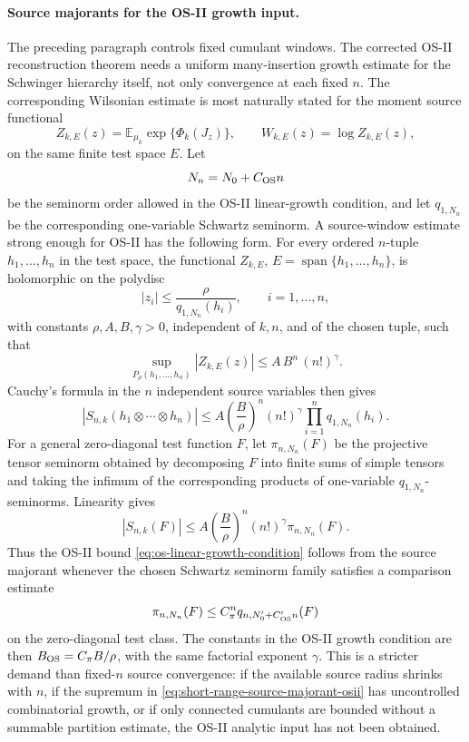 \paragraph{Source majorants for the OS-II growth input.}
The preceding paragraph controls fixed cumulant windows.  The corrected
OS-II reconstruction theorem needs a uniform many-insertion growth estimate
for the Schwinger hierarchy itself, not only convergence at each fixed
\(n\).  The corresponding Wilsonian estimate is most naturally stated for
the moment source functional
\begin{equation}
  Z_{k,E}(z)
  =
  \mathbb E_{\mu_k}\exp\{\Phi_k(J_z)\},
  \qquad
  W_{k,E}(z)=\log Z_{k,E}(z),
  \label{eq:short-range-moment-source-window}
\end{equation}
on the same finite test space \(E\).  Let
\[
  N_n=N_0+C_{\rm OS}n
\]
be the seminorm order allowed in the OS-II linear-growth condition, and let
\(q_{1,N_n}\) be the corresponding one-variable Schwartz seminorm.  A
source-window estimate strong enough for OS-II has the following form.  For
every ordered \(n\)-tuple \(h_1,\ldots,h_n\) in the test space, the functional
\(Z_{k,E}\), \(E=\operatorname{span}\{h_1,\ldots,h_n\}\), is holomorphic on
the polydisc
\[
  |z_i|\leq \frac{\rho}{q_{1,N_n}(h_i)},\qquad i=1,\ldots,n,
\]
with constants \(\rho,A,B,\gamma>0\), independent of \(k,n\), and of the
chosen tuple, such that
\begin{equation}
  \sup_{P_\rho(h_1,\ldots,h_n)}
  |Z_{k,E}(z)|
  \leq
  A\,B^n\,(n!)^\gamma .
  \label{eq:short-range-source-majorant-osii}
\end{equation}
Cauchy's formula in the \(n\) independent source variables then gives
\begin{equation}
  |S_{n,k}(h_1\otimes\cdots\otimes h_n)|
  \leq
  A\left(\frac B\rho\right)^n(n!)^\gamma
  \prod_{i=1}^n q_{1,N_n}(h_i).
  \label{eq:short-range-source-majorant-cauchy-moment}
\end{equation}
For a general zero-diagonal test function \(F\), let \(\pi_{n,N_n}(F)\) be
the projective tensor seminorm obtained by decomposing \(F\) into finite sums
of simple tensors and taking the infimum of the corresponding products of
one-variable \(q_{1,N_n}\)-seminorms.  Linearity gives
\begin{equation}
  |S_{n,k}(F)|
  \leq
  A\left(\frac B\rho\right)^n(n!)^\gamma
  \pi_{n,N_n}(F).
  \label{eq:short-range-source-majorant-projective-bound}
\end{equation}
Thus the OS-II bound
\eqref{eq:os-linear-growth-condition} follows from the source majorant
whenever the chosen Schwartz seminorm family satisfies a comparison estimate
\[
  \pi_{n,N_n}(F)
  \leq
  C_\pi^n q_{n,N'_0+C'_{\rm OS}n}(F)
\]
on the zero-diagonal test class.  The constants in the OS-II growth condition
are then \(B_{\rm OS}=C_\pi B/\rho\), with the same factorial exponent
\(\gamma\).  This is a stricter demand than fixed-\(n\) source convergence:
if the available source radius shrinks with \(n\), if the supremum in
\eqref{eq:short-range-source-majorant-osii} has uncontrolled combinatorial
growth, or if only connected cumulants are bounded without a summable
partition estimate, the OS-II analytic input has not been obtained.


